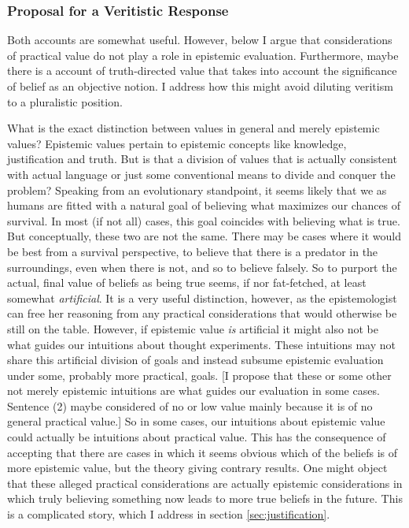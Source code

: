 \documentclass[12pt,numbers=noenddot]{scrartcl}
\begin{document}
\subsubsection{Proposal for a Veritistic Response}
Both accounts are somewhat useful. However, below I argue that considerations of practical value do not play a role in epistemic evaluation. Furthermore, maybe there is a account of truth-directed value that takes into account the significance of belief as an objective notion. I address how this might avoid diluting veritism to a pluralistic position.

What is the exact distinction between values in general and merely epistemic values? Epistemic values pertain to epistemic concepts like knowledge, justification and truth. But is that a division of values that is actually consistent with actual language or just some conventional means to divide and conquer the problem? Speaking from an evolutionary standpoint, it seems likely that we as humans are fitted with a natural goal of believing what maximizes our chances of survival. In most (if not all) cases, this goal coincides with believing what is true. But conceptually, these two are not the same. There may be cases where it would be best from a survival perspective, to believe that there is a predator in the surroundings, even when there is not, and so to believe falsely. So to purport the actual, final value of beliefs as being true seems, if nor fat-fetched, at least somewhat \emph{artificial}. It is a very useful distinction, however, as the epistemologist can free her reasoning from any practical considerations that would otherwise be still on the table. However, if epistemic value \emph{is} artificial it might also not be what guides our intuitions about thought experiments. These intuitions may not share this artificial division of goals and instead subsume epistemic evaluation under some, probably more practical, goals. [I propose that these or some other not merely epistemic intuitions are what guides our evaluation in some cases. Sentence (2) maybe considered of no or low value mainly because it is of no general practical value.] So in some cases, our intuitions about epistemic value could actually be intuitions about practical value. This has the consequence of accepting that there are cases in which it seems obvious which of the beliefs is of more epistemic value, but the theory giving contrary results. One might object that these alleged practical considerations are actually epistemic considerations in which truly believing something now leads to more true beliefs in the future. This is a complicated story, which I address in section \ref{sec:justification}.
\end{document}
